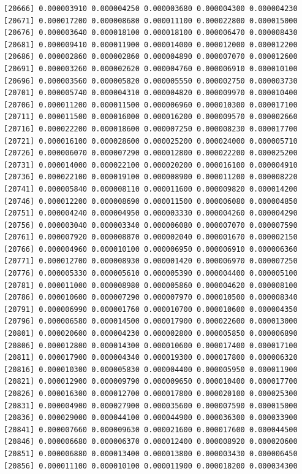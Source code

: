\documentclass[]{article}
\begin{document}
\begin{verbatim}
[20666] 0.000003910 0.000004250 0.000003680 0.000004300 0.000004230
[20671] 0.000017200 0.000008680 0.000011100 0.000022800 0.000015000
[20676] 0.000003640 0.000018100 0.000018100 0.000006470 0.000008430
[20681] 0.000009410 0.000011900 0.000014000 0.000012000 0.000012200
[20686] 0.000002860 0.000002860 0.000004890 0.000007070 0.000012600
[20691] 0.000003260 0.000002620 0.000004760 0.000006910 0.000010100
[20696] 0.000003560 0.000005820 0.000005550 0.000002750 0.000003730
[20701] 0.000005740 0.000004310 0.000004820 0.000009970 0.000010400
[20706] 0.000011200 0.000011500 0.000006960 0.000010300 0.000017100
[20711] 0.000011500 0.000016000 0.000016200 0.000009570 0.000002660
[20716] 0.000022200 0.000018600 0.000007250 0.000008230 0.000017700
[20721] 0.000016100 0.000028600 0.000025200 0.000024000 0.000005710
[20726] 0.000006070 0.000007290 0.000012800 0.000022200 0.000025200
[20731] 0.000014000 0.000022100 0.000020200 0.000016100 0.000004910
[20736] 0.000022100 0.000019100 0.000008900 0.000011200 0.000008220
[20741] 0.000005840 0.000008110 0.000011600 0.000009820 0.000014200
[20746] 0.000012200 0.000008690 0.000011500 0.000006080 0.000004850
[20751] 0.000004240 0.000004950 0.000003330 0.000004260 0.000004290
[20756] 0.000003040 0.000003340 0.000006080 0.000007070 0.000007590
[20761] 0.000007920 0.000008870 0.000002040 0.000001670 0.000002150
[20766] 0.000004960 0.000010100 0.000006950 0.000006910 0.000006360
[20771] 0.000012700 0.000008930 0.000001420 0.000006970 0.000007250
[20776] 0.000005330 0.000005610 0.000005390 0.000004400 0.000005100
[20781] 0.000011000 0.000008980 0.000005860 0.000004620 0.000008100
[20786] 0.000010600 0.000007290 0.000007970 0.000010500 0.000008340
[20791] 0.000006990 0.000001760 0.000010700 0.000010600 0.000004350
[20796] 0.000006580 0.000014500 0.000017900 0.000022600 0.000013000
[20801] 0.000020600 0.000004230 0.000002800 0.000005850 0.000006890
[20806] 0.000012800 0.000014300 0.000010600 0.000017400 0.000017100
[20811] 0.000017900 0.000004340 0.000019300 0.000017800 0.000006320
[20816] 0.000010300 0.000005830 0.000004400 0.000005950 0.000011900
[20821] 0.000012900 0.000009790 0.000009650 0.000010400 0.000017700
[20826] 0.000016300 0.000012700 0.000017800 0.000020100 0.000025300
[20831] 0.000004900 0.000027900 0.000035600 0.000007590 0.000015000
[20836] 0.000029000 0.000044100 0.000044900 0.000036300 0.000033900
[20841] 0.000007660 0.000009630 0.000021600 0.000017600 0.000044500
[20846] 0.000006680 0.000006370 0.000012400 0.000008920 0.000020600
[20851] 0.000006880 0.000013400 0.000013800 0.000003430 0.000006450
[20856] 0.000011100 0.000010100 0.000011900 0.000018200 0.000034300

\end{verbatim}
\end{document}
